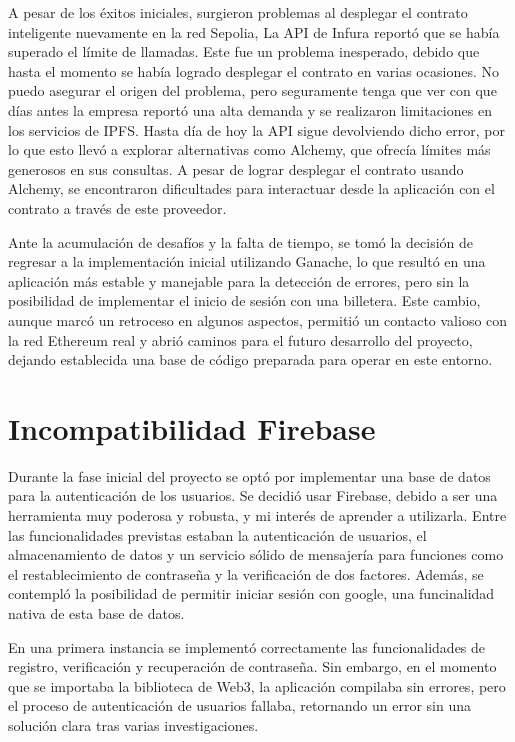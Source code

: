 A pesar de los éxitos iniciales, surgieron problemas al desplegar el contrato inteligente nuevamente en la red Sepolia, La API de Infura reportó que se había superado el límite de llamadas. 
Este fue un problema inesperado, debido que hasta el momento se había logrado desplegar el contrato en varias ocasiones. 
No puedo asegurar el origen del problema, pero seguramente tenga que ver con que días antes la empresa reportó una alta demanda y se realizaron limitaciones en los servicios de IPFS. 
Hasta día de hoy la API sigue devolviendo dicho error, por lo que esto llevó a explorar alternativas como Alchemy, que ofrecía límites más generosos en sus consultas. 
A pesar de lograr desplegar el contrato usando Alchemy, se encontraron dificultades para interactuar desde la aplicación con el contrato a través de este proveedor.

Ante la acumulación de desafíos y la falta de tiempo, se tomó la decisión de regresar a la implementación inicial utilizando Ganache, lo que resultó en una aplicación más estable y manejable para la detección de errores, pero sin la posibilidad de implementar el inicio de sesión con una billetera. Este cambio, aunque marcó un retroceso en algunos aspectos, permitió un contacto valioso con la red Ethereum real y abrió caminos para el futuro desarrollo del proyecto, dejando establecida una base de código preparada para operar en este entorno.



\section{Incompatibilidad Firebase}

Durante la fase inicial del proyecto se optó por implementar una base de datos para la autenticación de los usuarios.
Se decidió usar Firebase, debido a ser una herramienta muy poderosa y robusta, y mi interés de aprender a utilizarla. Entre las funcionalidades previstas estaban la autenticación de usuarios, el almacenamiento de datos y un servicio sólido de mensajería para funciones como el restablecimiento de contraseña y la verificación de dos factores.
Además, se contempló la posibilidad de permitir iniciar sesión con google, una funcinalidad nativa de esta base de datos.

En una primera instancia se implementó correctamente las funcionalidades de registro, verificación y recuperación de contraseña.
Sin embargo, en el momento que se importaba la biblioteca de Web3, la aplicación compilaba sin errores, pero el proceso de autenticación de usuarios fallaba, retornando un error sin una solución clara tras varias investigaciones.

